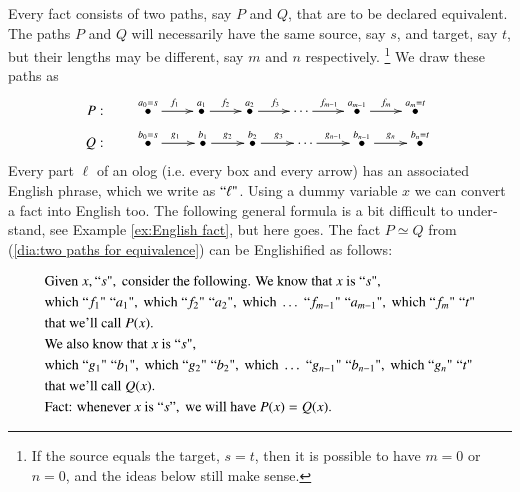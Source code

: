 \documentclass{book}
\def\tn{\textnormal}
\newcommand{\qt}[1]{\tn{``}#1\tn{"}}
\def\hsp{\hspace{.3in}}
\newcommand{\LMO}[1]{\stackrel{#1}{\bullet}}
\theoremstyle{theoremENG}
\theoremstyle{lemmaENG}
\theoremstyle{propositionENG}
\theoremstyle{corollaryENG}
\theoremstyle{factENG}
\theoremstyle{remarkENG}
\theoremstyle{exampleENG}
\newtheorem{exampleENG}[subsubsection]{\begin{english}Example\end{english}}
\theoremstyle{warningENG}
\theoremstyle{questionENG}
\theoremstyle{guessENG}
\theoremstyle{answerENG}
\theoremstyle{constructionENG}
\theoremstyle{rulesENG}
\theoremstyle{excENG}
\theoremstyle{appENG}
\theoremstyle{definitionENG}
\theoremstyle{notationENG}
\theoremstyle{conjectureENG}
\theoremstyle{postulateENG}
\theoremstyle{theoremRUS}
\theoremstyle{lemmaRUS}
\theoremstyle{propositionRUS}
\theoremstyle{corollaryRUS}
\theoremstyle{factRUS}
\theoremstyle{remarkRUS}
\theoremstyle{exampleRUS}
\theoremstyle{warningRUS}
\theoremstyle{questionRUS}
\theoremstyle{guessRUS}
\theoremstyle{answerRUS}
\theoremstyle{constructionRUS}
\theoremstyle{rulesRUS}
\theoremstyle{excRUS}
\theoremstyle{appRUS}
\theoremstyle{definitionRUS}
\theoremstyle{notationRUS}
\theoremstyle{conjectureRUS}
\theoremstyle{postulateRUS}
\begin{document}
\begin{english}
Every fact consists of two paths, say $P$ and $Q$, that are to be declared equivalent. The paths $P$ and $Q$ will necessarily have the same source, say $s$, and target, say $t$, but their lengths may be different, say $m$ and $n$ respectively.
\footnote{If the source equals the target, $s=t$, then it is possible  to have $m=0$ or $n=0$, and the ideas below still make sense.} 
We draw these paths as 
\begin{align}\label{dia:two paths for equivalence}
P:&\hsp\xymatrix@=22pt{\LMO{a_0=s}\ar[r]^{f_1}&\LMO{a_1}\ar[r]^{f_2}&\LMO{a_2}\ar[r]^{f_3}&\cdots\ar[r]^{f_{m-1}}&\LMO{a_{m-1}}\ar[r]^{f_m}&\LMO{a_m=t}}\\\nonumber
Q:&\hsp\xymatrix@=23pt{\LMO{b_0=s}\ar[r]^{g_1}&\LMO{b_1}\ar[r]^{g_2}&\LMO{b_2}\ar[r]^{g_3}&\cdots\ar[r]^{g_{n-1}}&\LMO{b_{n-1}}\ar[r]^{g_n}&\LMO{b_n=t}}
\end{align}
Every part $\ell$ of an olog (i.e. every box and every arrow) has an associated English phrase, which we write as $\qt{\ell}$. Using a dummy variable $x$ we can convert a fact into English too. The following general formula is a bit difficult to understand, see Example \ref{ex:English fact}, but here goes. The fact $P\simeq Q$ from (\ref{dia:two paths for equivalence}) can be Englishified as follows:

\begin{russian} \end{russian}

\begin{align}\label{dia:Englishification}\index{Englishification}
&\tn{Given }x,\qt{s},\tn{ consider the following. We know that }x\tn{ is }\qt{s}, \\
\nonumber&\tn {which } \qt{f_1}\;\qt{a_1}, \tn{ which } \qt{f_2}\;\qt{a_2}, \tn { which }\ldots \; \qt{f_{m-1}}\;\qt{a_{m-1}}, \tn { which } \qt{f_m}\;\qt{t}\\
\nonumber&\tn{that we'll call } P(x).\\
\nonumber&\tn{We also know that }x\tn{ is } \qt{s},\\
\nonumber&\tn {which } \qt{g_1}\;\qt{b_1}, \tn{ which }\qt{g_2}\;\qt{b_2}, \tn { which }\ldots\;\qt{g_{n-1}}\;\qt{b_{n-1}}, \tn { which } \qt{g_n}\;\qt{t}\\
\nonumber&\tn{that we'll call } Q(x).\\
\nonumber&\tn{Fact: whenever }x\tn{ is }``s",\tn{ we will have }P(x)=Q(x).
\end{align}

\begin{exampleENG}\label{ex:English fact}


\end{exampleENG}
\end{english}
\end{document}
